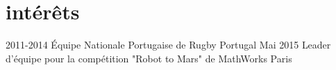 \documentclass[]{friggeri-cv} %
\begin{document}




\section{intérêts}


\begin{entrylist}
\entry
{2011-2014}
{Équipe Nationale Portugaise de Rugby}
{Portugal}
{}
\entry
{Mai 2015}
{Leader d'équipe pour la compétition "Robot to Mars" de MathWorks}
{Paris}
{}
\end{entrylist}

\end{document}
